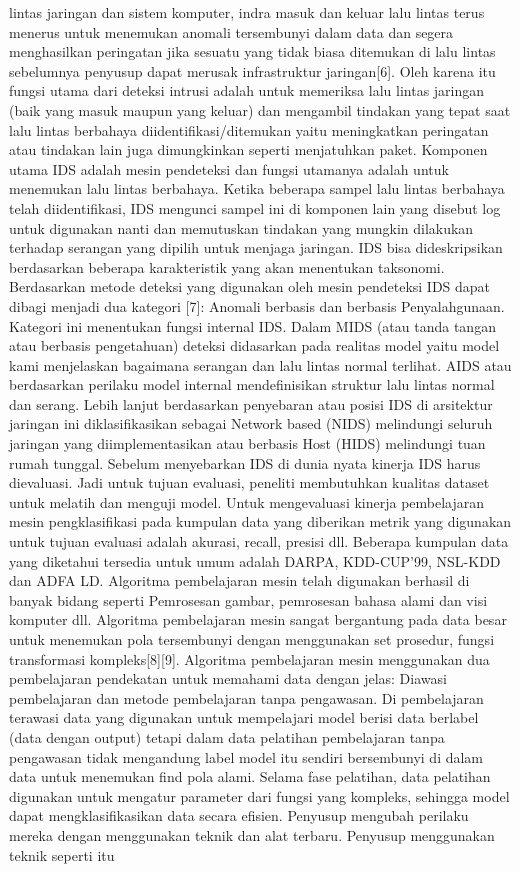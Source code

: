 \documentclass[conference]{IEEEtran}
\begin{document}
lintas jaringan dan sistem komputer, indra masuk dan keluar lalu lintas terus menerus untuk menemukan anomali tersembunyi dalam data dan segera menghasilkan peringatan jika sesuatu yang tidak biasa ditemukan di lalu lintas sebelumnya penyusup dapat merusak infrastruktur jaringan[6]\cite{masoodi2019symmetric}. Oleh karena itu fungsi utama dari deteksi intrusi adalah untuk memeriksa lalu lintas jaringan (baik yang masuk maupun yang keluar) dan mengambil tindakan yang tepat saat lalu lintas berbahaya diidentifikasi/ditemukan yaitu meningkatkan peringatan atau tindakan lain juga dimungkinkan seperti menjatuhkan paket. Komponen utama IDS adalah mesin pendeteksi dan fungsi utamanya adalah untuk menemukan lalu lintas berbahaya. Ketika beberapa sampel lalu lintas berbahaya telah diidentifikasi, IDS mengunci sampel ini di komponen lain yang disebut log untuk digunakan nanti dan memutuskan tindakan yang mungkin dilakukan terhadap serangan yang dipilih untuk menjaga jaringan. IDS bisa dideskripsikan berdasarkan beberapa karakteristik yang akan menentukan taksonomi. Berdasarkan metode deteksi yang digunakan oleh mesin pendeteksi IDS dapat dibagi menjadi dua kategori [7]\cite{ashoor2011difference}: Anomali berbasis dan berbasis Penyalahgunaan. Kategori ini menentukan fungsi internal IDS. Dalam MIDS (atau tanda tangan atau berbasis pengetahuan) deteksi didasarkan pada realitas model yaitu model kami menjelaskan bagaimana serangan dan lalu lintas normal terlihat. AIDS atau berdasarkan perilaku model internal mendefinisikan struktur lalu lintas normal dan serang. Lebih lanjut berdasarkan penyebaran atau posisi IDS di arsitektur jaringan ini diklasifikasikan sebagai Network based (NIDS) melindungi seluruh jaringan yang diimplementasikan atau berbasis Host (HIDS) melindungi tuan rumah tunggal. Sebelum menyebarkan IDS di dunia nyata kinerja IDS harus dievaluasi. Jadi untuk tujuan evaluasi, peneliti membutuhkan kualitas dataset untuk melatih dan menguji model. Untuk mengevaluasi kinerja pembelajaran mesin pengklasifikasi pada kumpulan data yang diberikan metrik yang digunakan untuk tujuan evaluasi adalah akurasi, recall, presisi dll. Beberapa kumpulan data yang diketahui tersedia untuk umum adalah DARPA, KDD-CUP'99, NSL-KDD dan ADFA LD. Algoritma pembelajaran mesin telah digunakan berhasil di banyak bidang seperti Pemrosesan gambar, pemrosesan bahasa alami dan visi komputer dll. Algoritma pembelajaran mesin sangat bergantung pada data besar untuk menemukan pola tersembunyi dengan menggunakan set prosedur, fungsi transformasi kompleks[8]\cite{rajadurai2020stacked}[9]\cite{ahanger2021effective}. Algoritma pembelajaran mesin menggunakan dua pembelajaran pendekatan untuk memahami data dengan jelas: Diawasi pembelajaran dan metode pembelajaran tanpa pengawasan. Di pembelajaran terawasi data yang digunakan untuk mempelajari model berisi data berlabel (data dengan output) tetapi dalam data pelatihan pembelajaran tanpa pengawasan tidak mengandung label model itu sendiri bersembunyi di dalam data untuk menemukan find pola alami. Selama fase pelatihan, data pelatihan digunakan untuk mengatur parameter dari fungsi yang kompleks, sehingga model dapat mengklasifikasikan data secara efisien. Penyusup mengubah perilaku mereka dengan menggunakan teknik dan alat terbaru. Penyusup menggunakan teknik seperti itu 
\end{document}
